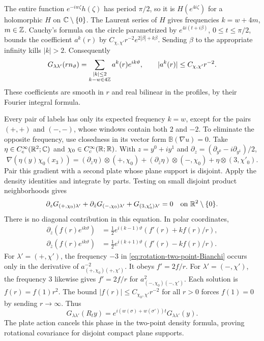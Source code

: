 The entire function $e^{-iw\zeta}h(\zeta)$ has period $\pi/2$,
so it is $H(e^{4i\zeta})$ for a holomorphic $H$ on
$\mathbb C\setminus\{0\}$. The Laurent series of $H$ gives
frequencies $k=w+4m$, $m\in\mathbb Z$. Cauchy's formula on the circle
parametrized by $e^{4i(t+i\beta)}$, $0\le t\le\pi/2$,
bounds the coefficient $a^k(r)$ by
$C_{\chi,\chi'}r^{-2}e^{2|\beta|+k\beta}$.
Sending $\beta$ to the appropriate infinity kills $|k|>2$.
Consequently
\begin{equation}\label{eq:rotation-two-point-window}
 G_{\lambda\lambda'}(rn_\vartheta)
   =\sum_{\substack{|k|\le2\\k-w\in4\mathbb Z}}a^k(r)e^{ik\vartheta},
 \qquad |a^k(r)|\le C_{\chi,\chi'}r^{-2}.
\end{equation}
These coefficients are smooth in $r$ and real bilinear in the
profiles, by their Fourier integral formula.

Every pair of labels has only its expected frequency $k=w$,
except for the pairs $(+,+)$ and $(-,-)$, whose windows contain
both $2$ and $-2$. To eliminate the opposite frequency, use
closedness in its vector form $\mathbb B(\nabla u)=0$.
Take $\eta\in C_c^\infty(\mathbb R^2;\mathbb C)$ and
$\chi_0\in C_c^\infty(\mathbb R;\mathbb R)$. With $z=y^0+iy^1$ and
$\partial_z=(\partial_{y^0}-i\partial_{y^1})/2$,
\[
 \nabla(\eta(y)\chi_0(x_3))
   =(\partial_z\eta)\otimes(+,\chi_0)
       +(\partial_{\bar z}\eta)\otimes(-,\chi_0)
       +\eta\otimes(3,\chi'_0).
\]
Pair this gradient with a second plate whose plane support is
disjoint. Apply the density identities and integrate by parts.
Testing on small disjoint product neighborhoods gives
\begin{equation}\label{eq:rotation-two-point-Bianchi}
 \partial_zG_{(+,\chi_0)\lambda'}
       +\partial_{\bar z}G_{(-,\chi_0)\lambda'}
       +G_{(3,\chi'_0)\lambda'}=0
                       \quad\text{on }\mathbb R^2\setminus\{0\}.
\end{equation}
There is no diagonal contribution in this equation.
In polar coordinates,
\begin{align*}
 \partial_z(f(r)e^{ik\vartheta})
       &=\tfrac12e^{i(k-1)\vartheta}(f'(r)+kf(r)/r),\\
 \partial_{\bar z}(f(r)e^{ik\vartheta})
       &=\tfrac12e^{i(k+1)\vartheta}(f'(r)-kf(r)/r).
\end{align*}
For $\lambda'=(+,\chi')$, the frequency $-3$ in
\eqref{eq:rotation-two-point-Bianchi} occurs only in the derivative
of $a^{-2}_{(+,\chi_0)(+,\chi')}$.
It obeys $f'=2f/r$.
For $\lambda'=(-,\chi')$, the frequency $3$ likewise gives
$f'=2f/r$ for $a^2_{(-,\chi_0)(-,\chi')}$.
Each solution is $f(r)=f(1)r^2$. The bound
$|f(r)|\le C_{\chi_0,\chi'}r^{-2}$ for all $r>0$ forces
$f(1)=0$ by sending $r\to\infty$. Thus
\begin{equation}\label{eq:rotation-two-point-phase}
 G_{\lambda\lambda'}(R_ty)
       =e^{i(w(\sigma)+w(\sigma'))t}G_{\lambda\lambda'}(y).
\end{equation}
The plate action cancels this phase in the two-point density
formula, proving rotational covariance for disjoint compact
plane supports.

